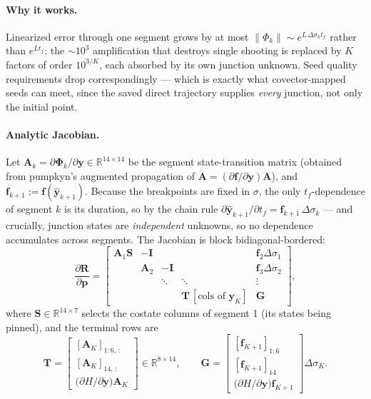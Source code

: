 \documentclass[11pt]{article}
\begin{document}
\paragraph{Why it works.} Linearized error through one segment grows by at
most $\lVert\Phi_k\rVert \sim e^{L\,\Delta\sigma_k t_f}$ rather than
$e^{L t_f}$: the $\sim10^{3}$ amplification that destroys single shooting
is replaced by $K$ factors of order $10^{3/K}$, each absorbed by its own
junction unknown. Seed quality requirements drop correspondingly --- which
is exactly what covector-mapped seeds can meet, since the saved direct
trajectory supplies \emph{every} junction, not only the initial point.

\paragraph{Analytic Jacobian.} Let
$\bm A_k = \partial\bm\Phi_k/\partial\bm y\in\mathbb{R}^{14\times14}$ be
the segment state-transition matrix (obtained from pumpkyn's augmented
propagation of $\dot{\bm A} = (\partial\bm f/\partial\bm y)\bm A$), and
$\bm f_{k+1} := \bm f(\hat{\bm y}_{k+1})$. Because the breakpoints are
fixed in $\sigma$, the only $t_f$-dependence of segment $k$ is its
duration, so by the chain rule
$\partial\hat{\bm y}_{k+1}/\partial t_f = \bm f_{k+1}\,\Delta\sigma_k$ ---
and crucially, junction states are \emph{independent} unknowns, so no
dependence accumulates across segments. The Jacobian is block
bidiagonal-bordered:
\begin{equation}
\frac{\partial \bm R}{\partial \bm p} =
\begin{bmatrix}
\bm A_1 \bm S & -\bm I & & & \bm f_2\Delta\sigma_1\\
 & \bm A_2 & -\bm I & & \bm f_3\Delta\sigma_2\\
 & & \ddots & \ddots & \vdots\\
 & & & \bm T\,[\text{cols of } \bm y_K] & \bm G
\end{bmatrix},
\end{equation}
where $\bm S \in \mathbb{R}^{14\times7}$ selects the costate columns of
segment 1 (its states being pinned), and the terminal rows are
\begin{equation}
\bm T = \begin{bmatrix} [\bm A_K]_{1:6,\,:}\\ [\bm A_K]_{14,\,:}\\
\big(\partial H/\partial\bm y\big)\bm A_K \end{bmatrix}
\in\mathbb{R}^{8\times14},
\qquad
\bm G = \begin{bmatrix} [\bm f_{K+1}]_{1:6}\\ [\bm f_{K+1}]_{14}\\
\big(\partial H/\partial\bm y\big)\bm f_{K+1}\end{bmatrix}\Delta\sigma_K .
\end{equation}
\end{document}
